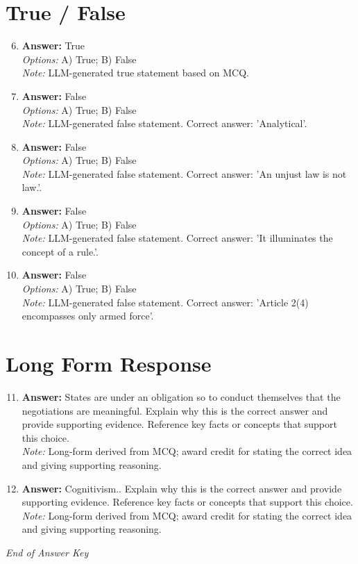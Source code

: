 \documentclass[12pt]{article}
\begin{document}
\section*{True / False}
\begin{enumerate}[label=\arabic*.]
\setcounter{enumi}{5}
\item \textbf{Answer:} True
\\ \textit{Options:} A) True; B) False
\\ \textit{Note:} LLM-generated true statement based on MCQ.
\item \textbf{Answer:} False
\\ \textit{Options:} A) True; B) False
\\ \textit{Note:} LLM-generated false statement. Correct answer: 'Analytical'.
\item \textbf{Answer:} False
\\ \textit{Options:} A) True; B) False
\\ \textit{Note:} LLM-generated false statement. Correct answer: 'An unjust law is not law.'.
\item \textbf{Answer:} False
\\ \textit{Options:} A) True; B) False
\\ \textit{Note:} LLM-generated false statement. Correct answer: 'It illuminates the concept of a rule.'.
\item \textbf{Answer:} False
\\ \textit{Options:} A) True; B) False
\\ \textit{Note:} LLM-generated false statement. Correct answer: 'Article 2(4) encompasses only armed force'.
\end{enumerate}

\section*{Long Form Response}
\begin{enumerate}[label=\arabic*.]
\setcounter{enumi}{10}
\item \textbf{Answer:} States are under an obligation so to conduct themselves that the negotiations are meaningful. Explain why this is the correct answer and provide supporting evidence. Reference key facts or concepts that support this choice.
\\ \textit{Note:} Long-form derived from MCQ; award credit for stating the correct idea and giving supporting reasoning.
\item \textbf{Answer:} Cognitivism.. Explain why this is the correct answer and provide supporting evidence. Reference key facts or concepts that support this choice.
\\ \textit{Note:} Long-form derived from MCQ; award credit for stating the correct idea and giving supporting reasoning.
\end{enumerate}

\vfill
\noindent\textit{End of Answer Key}
\end{document}

